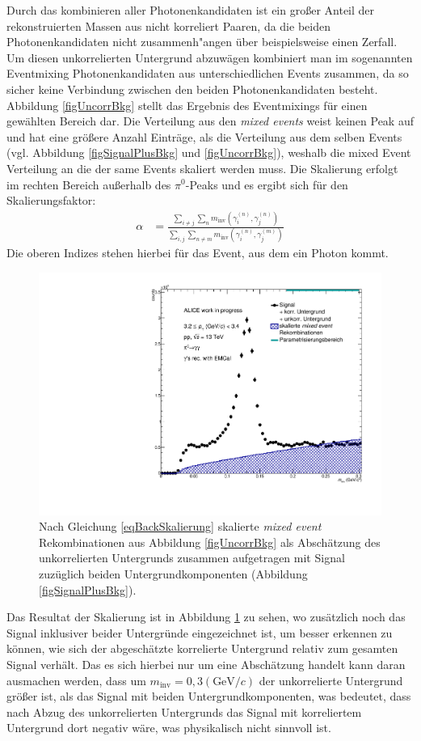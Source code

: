 Durch das kombinieren aller Photonenkandidaten ist ein gro{\ss}er Anteil der rekonstruierten Massen aus nicht korreliert Paaren, da die beiden Photonenkandidaten nicht zusammenh{"a}ngen {\"u}ber beispielsweise einen Zerfall. Um diesen unkorrelierten Untergrund abzuw{\"a}gen kombiniert man im sogenannten Eventmixing Photonenkandidaten aus unterschiedlichen Events zusammen, da so sicher keine Verbindung zwischen den beiden Photonenkandidaten besteht. Abbildung \ref{figUncorrBkg} stellt das Ergebnis des Eventmixings f{\"u}r einen gew{\"a}hlten Bereich dar.
\newline
Die Verteilung aus den {\it mixed events} weist keinen Peak auf und hat eine gr{\"o}{\ss}ere Anzahl Eintr{\"a}ge, als die Verteilung aus dem selben Events (vgl. Abbildung \ref{figSignalPlusBkg} und \ref{figUncorrBkg}), weshalb die mixed Event Verteilung an die der same Events skaliert werden muss. Die Skalierung erfolgt im rechten Bereich au{\ss}erhalb des $\pi^{0}$-Peaks und es ergibt sich f{\"u}r den Skalierungsfaktor:
	\begin{align}
	\label{eqBackSkalierung}
	\alpha &= \frac{\sum_{i \neq j}\sum_{n}m_{\text{inv}}\left( \gamma^{(n)}_{i},\gamma^{(n)}_{j}\right) }{\sum_{i,j}\sum_{n \neq m}m_{\text{inv}}\left( \gamma^{(n)}_{i},\gamma^{(m)}_{j}\right) }
	\end{align}
	Die oberen Indizes stehen hierbei f{\"u}r das Event, aus dem ein Photon kommt.\newline
	\begin{figure}[tbp]
		\centering
		\includegraphics[width=.7\linewidth]{hUncorrBkgNorm.pdf}
		\caption{Nach Gleichung \ref{eqBackSkalierung} skalierte {\it mixed event} Rekombinationen aus Abbildung \ref{figUncorrBkg} als Absch{\"a}tzung des unkorrelierten Untergrunds zusammen aufgetragen mit Signal zuz{\"u}glich beiden Untergrundkomponenten (Abbildung \ref{figSignalPlusBkg}).}
		\label{figUncorrBkgNorm}
	\end{figure}
	Das Resultat der Skalierung ist in Abbildung \ref{figUncorrBkgNorm} zu sehen, wo zus{\"a}tzlich noch das Signal inklusiver beider Untergr{\"u}nde eingezeichnet ist, um besser erkennen zu k{\"o}nnen, wie sich der abgesch{\"a}tzte korrelierte Untergrund relativ zum gesamten Signal verh{\"a}lt.
	Das es sich hierbei nur um eine Absch{\"a}tzung handelt kann daran ausmachen werden, dass um $m_{\text{inv}} = 0,3 (\text{GeV/}c)$ der unkorrelierte Untergrund gr{\"o}{\ss}er ist, als das Signal mit beiden Untergrundkomponenten, was bedeutet, dass nach Abzug des unkorrelierten Untergrunds das Signal mit korreliertem Untergrund dort negativ w{\"a}re, was physikalisch nicht sinnvoll ist.